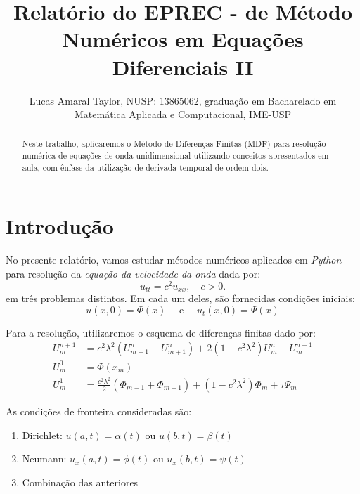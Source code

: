 \documentclass[column,amsmath,amssymb,floatfix]{revtex4}
\begin{document}
\title{Relatório do EPREC - de Método Numéricos em Equações Diferenciais II}

\author{Lucas Amaral Taylor, NUSP: 13865062, graduação em Bacharelado em Matemática Aplicada e Computacional,  IME-USP}

\begin{abstract}
	\baselineskip 11pt
	Neste trabalho, aplicaremos o Método de Diferenças Finitas (MDF) para resolução numérica de equações de onda unidimensional utilizando conceitos apresentados em aula, com ênfase da utilização de derivada temporal de ordem dois.
\end{abstract}

\maketitle

\section{Introdução} 
No presente relatório, vamos estudar métodos numéricos aplicados em \textit{Python} para resolução da \textit{equação da velocidade da onda} dada por:
\begin{equation}
	u_{tt} = c^2 u_{xx}, \quad c>0.
	\label{eq:equacao-da-onda}
\end{equation}
em três problemas distintos. Em cada um deles, são fornecidas condições iniciais:
\begin{equation}
	u(x,0) = \Phi(x) \quad \text{ e } \quad u_t(x, 0) = \Psi(x)
	\label{eq:condicao-inicial-onda}
\end{equation}

Para a resolução, utilizaremos o esquema de diferenças finitas dado por:
\begin{align}
	U_m^{n+1} & = c^2\lambda^2(U_{m-1}^n + U_{m+1}^n) + 2(1-c^2\lambda^2)U_m^n - U_m^{n-1} \label{eq:edf-principal}                  \\
	U_m^0     & = \Phi(x_m) \label{eq:edf-inicial}                                                                                   \\
	U_m^1     & = \frac{c^2\lambda^2}{2}(\Phi_{m-1} + \Phi_{m+1}) + (1-c^2\lambda^2)\Phi_m + \tau\Psi_m \label{eq:edf-passo-inicial} 
\end{align}

As condições de fronteira consideradas são:
\begin{enumerate}[label=\roman*.]
	\item Dirichlet: $u(a,t) = \alpha(t)$ ou $u(b,t) = \beta(t)$
	\item Neumann: $u_x(a,t) = \phi(t)$ ou $u_x(b,t) = \psi(t)$
	\item Combinação das anteriores
\end{enumerate}
\end{document}
